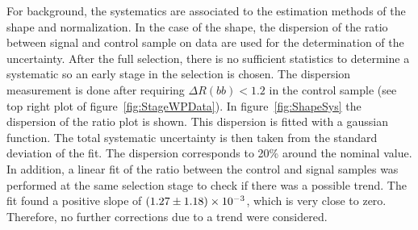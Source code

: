 \begin{table*}[htbH]
\begin{center}
\end{center}
\caption{Summary of the uncertainties for signal yields. In addition, all mass points have 2.6\% uncertainty from luminosity measurement.\label{tab:sys}}
\end{table*}

For background, the systematics are associated to the estimation methods of the shape and normalization. In the case of the shape, the dispersion of the ratio between signal and control sample on data are used for the determination of the uncertainty. After the full selection, there is no sufficient statistics to determine a systematic so an early stage in the selection is chosen. The dispersion measurement is done after requiring $\Delta R(bb) <1.2$ in the control sample (see top right plot of figure~\ref{fig:StageWPData}). In figure~\ref{fig:ShapeSys} the dispersion of the ratio plot is shown. This dispersion is fitted with a gaussian function. The total systematic uncertainty is then taken from the standard deviation of the fit. The dispersion corresponds to 20\% around the nominal value. In addition, a linear fit of the ratio between the control and signal samples was performed at the same selection stage to check if there was a possible trend. The fit found a positive slope of $(1.27\pm1.18)\times 10^{-3}$, which is very close to zero. Therefore, no further corrections due to a trend were considered. 

